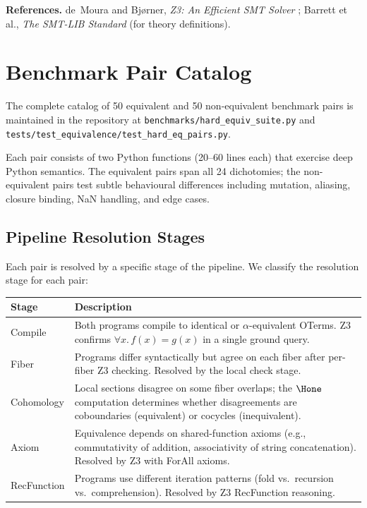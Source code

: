 \noindent
\textbf{References.}
de~Moura and Bj{\o}rner, \emph{Z3: An Efficient SMT Solver}
\cite{moura2008};
Barrett et al., \emph{The SMT-LIB Standard} (for theory definitions).


\chapter{Benchmark Pair Catalog}
\label{app:pairs}

The complete catalog of 50 equivalent and 50 non-equivalent benchmark
pairs is maintained in the repository at
\texttt{benchmarks/hard\_equiv\_suite.py} and
\texttt{tests/test\_equivalence/test\_hard\_eq\_pairs.py}.

Each pair consists of two Python functions (20--60 lines each) that
exercise deep Python semantics.  The equivalent pairs span all 24
dichotomies; the non-equivalent pairs test subtle behavioural
differences including mutation, aliasing, closure binding, NaN
handling, and edge cases.

\section{Pipeline Resolution Stages}

Each pair is resolved by a specific stage of the pipeline.  We
classify the resolution stage for each pair:

\begin{center}
\begin{tabular}{l p{8cm}}
  \textbf{Stage} & \textbf{Description} \\
  \hline
  \textsf{Compile} &
    Both programs compile to identical or $\alpha$-equivalent OTerms.
    Z3 confirms $\forall x.\, f(x) = g(x)$ in a single ground query.
    \\
  \textsf{Fiber} &
    Programs differ syntactically but agree on each fiber after
    per-fiber Z3 checking.  Resolved by the local check stage. \\
  \textsf{Cohomology} &
    Local sections disagree on some fiber overlaps; the
    $\Hone$ computation determines whether disagreements are
    coboundaries (equivalent) or cocycles (inequivalent). \\
  \textsf{Axiom} &
    Equivalence depends on shared-function axioms (e.g., commutativity
    of addition, associativity of string concatenation).  Resolved
    by Z3 with ForAll axioms. \\
  \textsf{RecFunction} &
    Programs use different iteration patterns (fold vs.\ recursion
    vs.\ comprehension).  Resolved by Z3 RecFunction reasoning. \\
\end{tabular}
\end{center}

